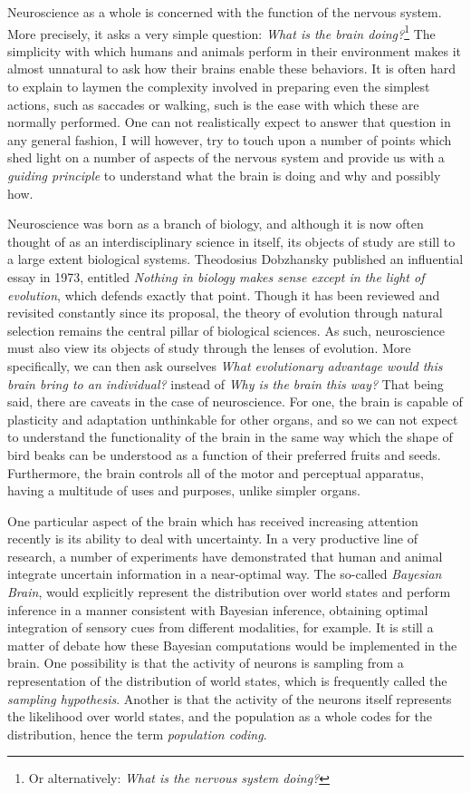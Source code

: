 Neuroscience as a whole is concerned with the function of the nervous system. More precisely, it asks a very simple question: {\em What is the brain doing?}\footnote{ Or alternatively: {\em What is the nervous system doing?}} The simplicity with which humans and animals perform in their environment makes it almost unnatural to ask how their brains enable these behaviors. It is often hard to explain to laymen the complexity involved in preparing even the simplest actions, such as saccades or walking, such is the ease with which these are normally performed. One can not realistically expect to answer that question in any general fashion, I will however, try to touch upon a number of points which shed light on a number of aspects of the nervous system and provide us with a {\em guiding principle} to understand what the brain is doing and why and possibly how.\par
Neuroscience was born as a branch of biology, and although it is now often thought of as  an interdisciplinary science in itself, its objects of study are still to a large extent biological systems. Theodosius Dobzhansky published an influential essay in 1973, entitled {\em Nothing in biology makes sense except in the light of evolution}\cite{Dobzhansky1973}, which defends exactly that point. Though it has been reviewed and revisited constantly since its proposal, the theory of evolution through natural selection remains the central pillar of biological sciences. As such, neuroscience must also view its objects of study through the lenses of evolution. More specifically, we can then ask ourselves {\em What evolutionary advantage would this brain bring to an individual?} instead of {\em Why is the brain this way?} That being said,  there are caveats in the case of neuroscience. For one, the brain is capable of plasticity and adaptation unthinkable for other organs, and so we can not expect to understand the functionality of the brain in the same way which the shape of bird beaks can be understood as a function of their preferred fruits and seeds. Furthermore, the brain controls all of the motor and perceptual apparatus, having a multitude of uses and purposes, unlike simpler organs.\par
One particular aspect of the brain which has received increasing attention recently is its ability to deal with uncertainty. In a very productive line of research, a number of experiments have demonstrated that human and animal integrate uncertain information in a near-optimal way. The so-called {\em Bayesian Brain}\cite{Knill2004}, would explicitly represent the distribution over world states and perform inference in a manner consistent with Bayesian inference, obtaining optimal integration of sensory cues from different modalities, for example. It is still a matter of debate how these Bayesian computations would be implemented in the brain. One possibility is that the activity of neurons is sampling from a representation of the distribution of world states\cite{Berkes2011}, which is frequently called the {\em sampling hypothesis}. Another is that the activity of the neurons itself represents the likelihood over world states\cite{Ma2006}, and the population as a whole codes for the distribution, hence the term {\em population coding}.\par

